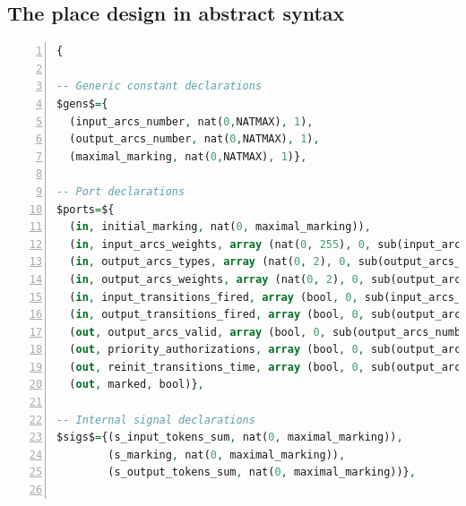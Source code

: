 \documentclass[pdflatex,sn-mathphys]{sn-jnl}%
\theoremstyle{thmstyleone}%
\theoremstyle{thmstyletwo}%
\theoremstyle{thmstylethree}%
\begin{document}


% 
% 
% 
% 
% 
% 

\clearpage
\begin{appendices}

\section{The place design in abstract \hvhdl{} syntax}
\label{app:place-design}

\begin{lstlisting}[language=VHDL,
  label={lst:place-design-abss},
  caption={The \texttt{place} design in \hvhdl{} abstract syntax.},
  basicstyle=\fontsize{8}{10}\selectfont,
  framexleftmargin=1.5em,
  xleftmargin=2em,
  numbers=left,
  numberstyle=\tiny\ttfamily]
{
    
-- Generic constant declarations
$gens$={
  (input_arcs_number, nat(0,NATMAX), 1), 
  (output_arcs_number, nat(0,NATMAX), 1),
  (maximal_marking, nat(0,NATMAX), 1)},

-- Port declarations
$ports=${
  (in, initial_marking, nat(0, maximal_marking)),
  (in, input_arcs_weights, array (nat(0, 255), 0, sub(input_arcs_number, 1))),
  (in, output_arcs_types, array (nat(0, 2), 0, sub(output_arcs_number, 1))),
  (in, output_arcs_weights, array (nat(0, 2), 0, sub(output_arcs_number, 1))),
  (in, input_transitions_fired, array (bool, 0, sub(input_arcs_number, 1))),          
  (in, output_transitions_fired, array (bool, 0, sub(output_arcs_number, 1))),
  (out, output_arcs_valid, array (bool, 0, sub(output_arcs_number, 1))),
  (out, priority_authorizations, array (bool, 0, sub(output_arcs_number, 1))),
  (out, reinit_transitions_time, array (bool, 0, sub(output_arcs_number, 1))),
  (out, marked, bool)},
  
-- Internal signal declarations
$sigs$={(s_input_tokens_sum, nat(0, maximal_marking)),
        (s_marking, nat(0, maximal_marking)),
        (s_output_tokens_sum, nat(0, maximal_marking))},
       

\end{lstlisting}
\end{appendices}
\end{document}
